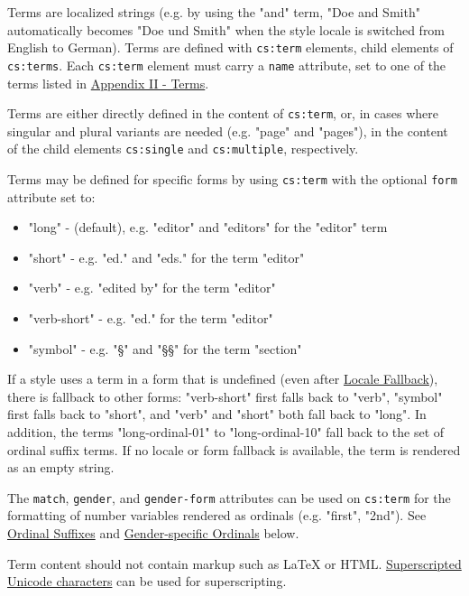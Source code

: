 Terms are localized strings (e.g. by using the "and" term, "Doe and
Smith" automatically becomes "Doe und Smith" when the style locale is
switched from English to German). Terms are defined with
\texttt{cs:term} elements, child elements of \texttt{cs:terms}. Each
\texttt{cs:term} element must carry a \texttt{name} attribute, set to
one of the terms listed in
\protect\hyperlink{appendix-ii---terms}{Appendix II - Terms}.

Terms are either directly defined in the content of \texttt{cs:term},
or, in cases where singular and plural variants are needed (e.g. "page"
and "pages"), in the content of the child elements \texttt{cs:single}
and \texttt{cs:multiple}, respectively.

Terms may be defined for specific forms by using \texttt{cs:term} with
the optional \texttt{form} attribute set to:

\begin{itemize}
\tightlist
\item
  "long" - (default), e.g. "editor" and "editors" for the "editor" term
\item
  "short" - e.g. "ed." and "eds." for the term "editor"
\item
  "verb" - e.g. "edited by" for the term "editor"
\item
  "verb-short" - e.g. "ed." for the term "editor"
\item
  "symbol" - e.g. "§" and "§§" for the term "section"
\end{itemize}

If a style uses a term in a form that is undefined (even after
\protect\hyperlink{locale-fallback}{Locale Fallback}), there is fallback
to other forms: "verb-short" first falls back to "verb", "symbol" first
falls back to "short", and "verb" and "short" both fall back to "long".
In addition, the terms "long-ordinal-01" to "long-ordinal-10" fall back
to the set of ordinal suffix terms. If no locale or form fallback is
available, the term is rendered as an empty string.

The \texttt{match}, \texttt{gender}, and \texttt{gender-form} attributes
can be used on \texttt{cs:term} for the formatting of number variables
rendered as ordinals (e.g. "first", "2nd"). See
\protect\hyperlink{ordinal-suffixes}{Ordinal Suffixes} and
\protect\hyperlink{gender-specific-ordinals}{Gender-specific Ordinals}
below.

Term content should not contain markup such as LaTeX or HTML.
\href{http://unicode.org/reports/tr30/datafiles/SuperscriptFolding.txt}{Superscripted
Unicode characters} can be used for superscripting.

